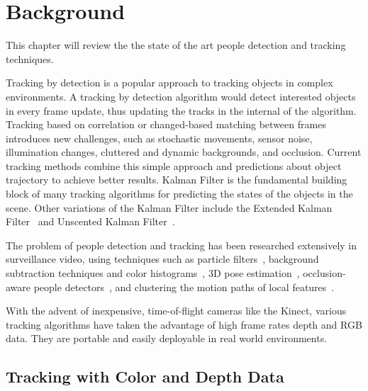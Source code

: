 


\chapter{Background}

\label{chapter:background}

This chapter will review the the state of the art people detection and tracking techniques.

Tracking by detection is a popular approach to tracking objects in complex environments. A tracking by detection algorithm would detect interested objects in every frame update, thus updating the tracks in the internal of the algorithm. Tracking based on correlation or changed-based matching between frames introduces new challenges, such as stochastic movements, sensor noise, illumination changes, cluttered and dynamic backgrounds, and occlusion. Current tracking methods combine this simple approach and predictions about object trajectory to achieve better results. Kalman Filter is the fundamental building block of many tracking algorithms for predicting the states of the objects in the scene. Other variations of the Kalman Filter include the Extended Kalman Filter~\cite{ljung_extended_kalman} and Unscented Kalman Filter~\cite{julier_unscented_kalman}.

The problem of people detection and tracking has been researched extensively in surveillance video, using techniques such as particle filters~\cite{sherrah_particle_filter_video_surveillance}, background subtraction techniques and color histograms~\cite{mckenna_tracking_groups_of_people}, 3D pose estimation~\cite{andriluka_3d_pose_estimation_tracking}, occlusion-aware people detectors~\cite{tang_people_dectector}, and clustering the motion paths of local features~\cite{gudys_cluster_local_features}.

With the advent of inexpensive, time-of-flight cameras like the Kinect, various tracking algorithms have taken the advantage of high frame rates depth and RGB data. They are portable and easily deployable in real world environments.

\section{Tracking with Color and Depth Data}

